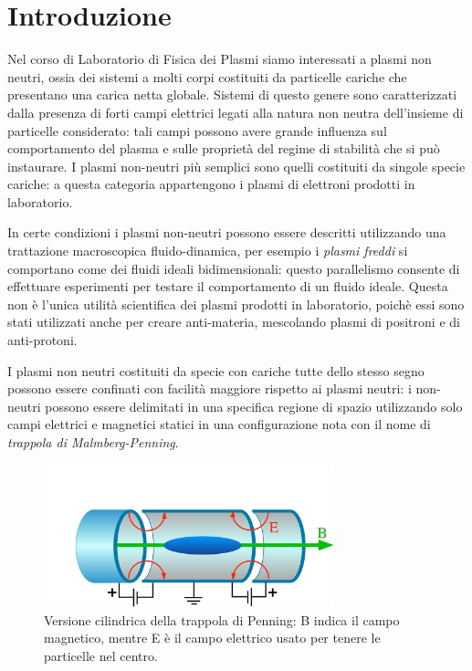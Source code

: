 \chapter{Introduzione}

Nel corso di Laboratorio di Fisica dei Plasmi siamo interessati a plasmi non neutri, ossia dei sistemi a molti corpi
costituiti da particelle cariche che presentano una carica netta globale. Sistemi di questo genere sono caratterizzati
dalla presenza di forti campi elettrici legati alla natura non neutra dell'insieme di particelle considerato: tali campi
possono avere grande influenza sul comportamento del plasma e sulle proprietà del regime di stabilità che si può instaurare.
I plasmi non-neutri più semplici sono quelli costituiti da singole specie cariche: a questa categoria appartengono i plasmi 
di elettroni prodotti in laboratorio.

In certe condizioni i plasmi non-neutri possono essere descritti utilizzando una trattazione macroscopica fluido-dinamica, per 
esempio  i \textit{plasmi freddi} si comportano come dei fluidi ideali bidimensionali: questo parallelismo consente di effettuare 
esperimenti per testare il comportamento di un fluido ideale. Questa non è l'unica utilità scientifica dei plasmi prodotti in 
laboratorio, poichè essi sono stati utilizzati anche per creare anti-materia, mescolando plasmi di positroni e di anti-protoni.

I plasmi non neutri costituiti da specie con cariche tutte dello stesso segno possono essere confinati con facilità maggiore 
rispetto ai plasmi neutri: i non-neutri possono essere delimitati in una specifica regione di spazio utilizzando solo campi 
elettrici e magnetici statici in una configurazione nota con il nome di \textit{trappola di Malmberg-Penning}.
\begin{figure}[H]
  \centering
  \includegraphics[width=0.75\textwidth]{Immagini/Penning_Trap.jpg}
  \caption{ Versione cilindrica della trappola di Penning: B indica il campo magnetico, mentre E è il campo
  elettrico usato per tenere le particelle nel centro.}
  \label{figure: PenningTrap}
\end{figure}

